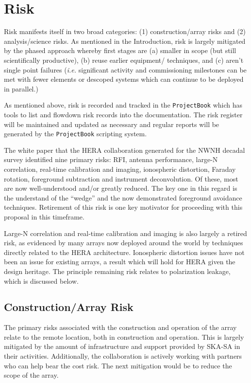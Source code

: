\documentclass[preprint]{aastex}
\begin{document}
\section{Risk}
\label{sec:risk}
Risk manifests itself in two broad categories: (1) construction/array risks and (2)
analysis/science risks. As mentioned in the Introduction, risk is largely mitigated by the phased approach
whereby first stages are (a) smaller in scope (but still scientifically productive), (b) reuse earlier equipment/
techniques, and (c) aren't single point failures ({\em i.e.} significant activity and commissioning milestones 
can be met with fewer elements or descoped systems which can continue to be deployed in parallel.)

As mentioned above, risk is recorded and tracked in the {\tt ProjectBook} which has tools 
to list and flowdown risk records into the documentation.  The risk register will be 
maintained and updated as necessary and regular reports will be generated by the
{\tt ProjectBook} scripting system.

The white paper that the HERA collaboration generated for the NWNH decadal survey identified nine
primary risks:  RFI, antenna performance, large-N correlation, real-time calibration and imaging, 
ionospheric distortion, Faraday rotation, foreground subtraction and instrument deconvolution.
Of these, most are now well-understood and/or greatly reduced.  The key one in this regard is
the understand of the ``wedge'' and the now demonstrated foreground avoidance techniques.
Retirement of this risk is one key motivator for proceeding with this proposal in this
timeframe.  

Large-N correlation and real-time calibration and imaging is also largely a retired
risk, as evidenced by many arrays now deployed around the world by techniques
directly related to the HERA architecture. Ionospheric distortion issues have not
been an issue for existing arrays, a result which will hold for HERA given the design
heritage. The principle remaining risk relates to polarization leakage, which is
discussed below.

\subsection{Construction/Array Risk}
The primary risks associated with the construction and operation of the array relate
to the remote location, both in construction and operation. This is largely mitigated
by the amount of infrastructure and support provided by SKA-SA in their activities.
Additionally, the collaboration is actively working with partners who can help bear
the cost risk.  The next mitigation would be to reduce the scope of the array.
\end{document}
